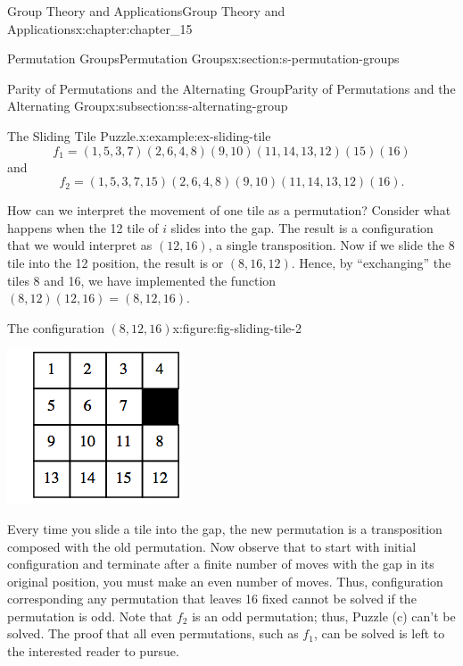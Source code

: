 \documentclass[oneside,10pt,]{book}
\numberwithin{equation}{section}
\begin{document}
\begin{chapterptx}{Group Theory and Applications}{}{Group Theory and Applications}{}{}{x:chapter:chapter_15}
\begin{sectionptx}{Permutation Groups}{}{Permutation Groups}{}{}{x:section:s-permutation-groups}
\begin{subsectionptx}{Parity of Permutations and the Alternating Group}{}{Parity of Permutations and the Alternating Group}{}{}{x:subsection:ss-alternating-group}
\begin{example}{The Sliding Tile Puzzle.}{x:example:ex-sliding-tile}
\begin{equation*}
f_1 = (1, 5, 3, 7)(2, 6, 4, 8)(9, 10)(11, 14, 13, 12)(15)(16)
\end{equation*}
and%
\begin{equation*}
f_2 = (1, 5, 3, 7, 15)(2, 6, 4, 8)(9, 10)(11, 14, 13, 12)(16).
\end{equation*}
%
\par
How can we interpret the movement of one tile as a permutation?  Consider what happens when the 12 tile of \(i\) slides into the gap. The result is a configuration that we would interpret as \((12,16)\), a single transposition. Now if we slide the 8 tile into the 12 position, the result is or \((8, 16, 12)\). Hence, by ``exchanging'' the tiles 8 and 16, we have implemented the function \((8, 12) (12, 16) = (8, 12, 16)\).%
\begin{figureptx}{The configuration \((8, 12, 16)\)}{x:figure:fig-sliding-tile-2}{}%
\begin{image}{0.3}{0.4}{0.3}%
\includegraphics[width=\linewidth]{images/fig-sliding-tile-2.png}
\end{image}%
\tcblower
\end{figureptx}%
Every time you slide a tile into the gap, the new permutation is a transposition composed with the old permutation. Now observe that to start with initial configuration and terminate after a finite number of moves with the gap in its original position, you must make an even number of moves. Thus, configuration corresponding any permutation that leaves 16 fixed  cannot be solved if the permutation is odd.  Note that \(f_2\) is an odd permutation; thus, Puzzle (c) can't be solved. The proof that all even permutations, such as  \(f_1\), can be solved is left to the interested reader to pursue.%

\end{example}
\end{subsectionptx}
\end{sectionptx}
\end{chapterptx}
\end{document}
